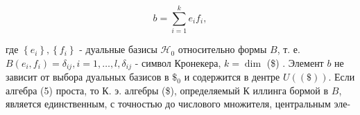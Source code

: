 \documentclass[10pt]{article}
\begin{document}
\[

b=\sum_{i=1}^{k} e_{i} f_{i},

\]



где $\left\{e_{i}\right\},\left\{f_{i}\right\}$ - дуальные базисы $\mathscr{H}_{0}$ относительно формы $B$, т. е. $B\left(e_{i}, f_{i}\right)=\delta_{i j}, i=1, \ldots, l, \delta_{i j}$ - символ Кронекера, $k=\operatorname{dim}$ (\$) . Элемент $b$ не зависит от выбора дуальных базисов в $\$_{0}$ и содержится в дентре $U((\$))$. Если алгебра (5) проста, то К. э. алгебры (\$), определяемый К иллинга бормой в $B$, является единственным, с точностью до числового множителя, центральным эле-
\end{document}
